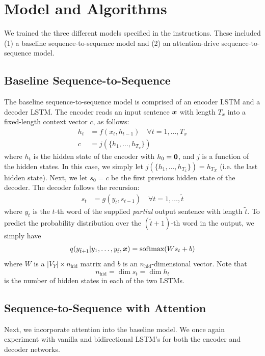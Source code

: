 \documentclass[11pt]{article}
\begin{document}
\section{Model and Algorithms}

We trained the three different models specified in the instructions.  These included (1) a baseline sequence-to-sequence model and (2) an attention-drive sequence-to-sequence model.

\subsection{Baseline Sequence-to-Sequence}
The baseline sequence-to-sequence model is comprised of an encoder LSTM and a decoder LSTM.  The encoder reads an input sentence $\boldsymbol{x}$ with length $T_x$ into a fixed-length context vector $c$, as follows:
\begin{align*}
h_t &= f(x_t, h_{t-1}) \quad \forall t = 1, \ldots, T_x \\
c &= j(\{h_1, \ldots, h_{T_x}\})
\end{align*}  
where $h_t$ is the hidden state of the encoder with $h_0 = \bold{0}$, and $j$ is a function of the hidden states.  In this case, we simply let $j(\{h_1, \ldots, h_{T_x}\}) = h_{T_X}$ (i.e. the last hidden state).  Next, we let $s_0 = c$ be the first previous hidden state of the decoder.  The decoder follows the recursion:
\begin{align*}
s_t &= g(y_t, s_{t-1}) \quad \forall t = 1, \ldots, \tilde{t}
\end{align*}
where $y_t$ is the $t$-th word of the supplied \emph{partial} output sentence with length $\tilde{t}$.  To predict the probability distribution over the $(\tilde{t} + 1)$-th word in the output, we simply have
\begin{align*}
q(y_{\tilde{t} + 1} \vert y_1, \ldots, y_{\tilde t}, \boldsymbol{x}) = \text{softmax}(W s_t + b)
\end{align*}  
where $W$ is a $\lvert V_Y \rvert \times n_\text{hid}$ matrix and $b$ is an $n_\text{hid}$-dimensional vector.  Note that 
$$n_\text{hid} = \dim s_t = \dim h_t$$
is the number of hidden states in each of the two LSTMs.

\subsection{Sequence-to-Sequence with Attention}
Next, we incorporate attention into the baseline model. We once again experiment with vanilla and bidirectional LSTM's for both the encoder and decoder networks.
\end{document}
